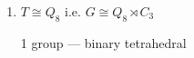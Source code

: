 \begin{enumerate}
    \item \(T \cong Q_8\) i.e. \(G \cong Q_8 \rtimes C_3\)

        1 group --- binary tetrahedral
\end{enumerate}



